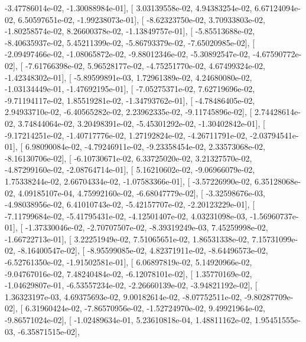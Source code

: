\documentclass{article}
\begin{document}
         -3.47786014e-02,  -1.30088984e-01],
       [  3.03139558e-02,   4.94383254e-02,   6.67124094e-02,
          6.50597651e-02,  -1.99238073e-01],
       [ -8.62323750e-02,   3.70933803e-02,  -1.80258574e-02,
          8.26600378e-02,  -1.13849757e-01],
       [ -5.85513688e-02,  -8.40635937e-02,   5.45211399e-02,
         -5.86793379e-02,  -7.65020985e-02],
       [ -2.09497466e-02,  -1.08065872e-02,  -9.88012346e-02,
         -5.30892547e-02,  -4.67590772e-02],
       [ -7.61766398e-02,   5.96528177e-02,  -4.75251770e-02,
          4.67499324e-02,  -1.42348302e-01],
       [ -5.89599891e-03,   1.72961389e-02,   4.24680080e-02,
         -1.03134449e-01,  -1.47692195e-01],
       [ -7.05275371e-02,   7.62719696e-02,  -9.71194117e-02,
          1.85519281e-02,  -1.34793762e-01],
       [ -4.78486405e-02,   2.94933710e-02,  -6.40565282e-02,
          2.23962335e-02,  -9.11745896e-02],
       [  2.74428614e-02,   3.74844064e-02,   3.20498391e-02,
         -5.45301292e-02,  -1.30402842e-01],
       [ -9.17214251e-02,  -1.40717776e-02,   1.27192824e-02,
         -4.26711791e-02,  -2.03794541e-01],
       [  6.98090084e-02,  -4.79246911e-02,  -9.23358454e-02,
          2.33573068e-02,  -8.16130706e-02],
       [ -6.10730671e-02,   6.33725020e-02,   3.21327570e-02,
         -4.87299160e-02,  -2.08764714e-01],
       [  5.16210602e-02,  -9.06966079e-02,   1.75338244e-02,
          2.66704334e-02,  -1.07583366e-01],
       [ -3.57226990e-02,   6.35128068e-02,   4.09185107e-04,
          4.75992160e-02,  -6.68047779e-02],
       [ -3.32598676e-03,  -4.98038956e-02,   6.41010743e-02,
         -5.42157707e-02,  -2.20123229e-01],
       [ -7.11799684e-02,  -5.41795431e-02,  -4.12501407e-02,
          4.03231098e-03,  -1.56960737e-01],
       [ -1.37330046e-02,  -2.70707507e-02,  -8.39319249e-03,
          7.45259998e-02,  -1.66722713e-01],
       [  3.22251949e-02,   7.51065651e-02,   1.86531338e-02,
          7.15731099e-02,  -8.16400547e-02],
       [ -8.95599085e-02,   4.82371911e-02,  -8.64496573e-02,
         -6.52761350e-02,  -1.91502581e-01],
       [  6.06897819e-02,   5.14920966e-02,  -9.04767016e-02,
          7.48240484e-02,  -6.12078101e-02],
       [  1.35770169e-02,  -1.04629807e-01,  -6.53557234e-02,
         -2.26660139e-02,  -3.94821192e-02],
       [  1.36323197e-03,   4.69375693e-02,   9.00182614e-02,
         -8.07752511e-02,  -9.80287709e-02],
       [  6.31960424e-02,  -7.86570956e-02,  -1.52724970e-02,
          9.49921964e-02,  -9.86571024e-02],
       [ -1.02489634e-01,   5.23610818e-04,   1.48811162e-02,
          1.95451555e-03,  -6.35871515e-02],
\end{document}
